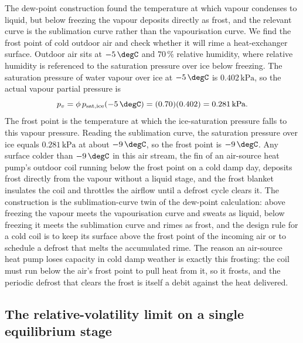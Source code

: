 The dew-point construction found the temperature at which vapour condenses to
liquid, but below freezing the vapour deposits directly as frost, and the
relevant curve is the sublimation curve rather than the vapourisation curve. We
find the frost point of cold outdoor air and check whether it will rime a
heat-exchanger surface. Outdoor air sits at $-5\,\degC$ and $70\,\%$ relative
humidity, where relative humidity is referenced to the saturation pressure over
ice below freezing. The saturation pressure of water vapour over ice at
$-5\,\degC$ is $0.402\,\text{kPa}$, so the actual vapour partial pressure is
\[
p_v = \phi\,p_{\text{sat,ice}}(-5\,\degC) = (0.70)(0.402) = 0.281\,\text{kPa}.
\]
The frost point is the temperature at which the ice-saturation pressure falls to
this vapour pressure. Reading the sublimation curve, the saturation pressure
over ice equals $0.281\,\text{kPa}$ at about $-9\,\degC$, so the frost point is
$-9\,\degC$. Any surface colder than $-9\,\degC$ in this air stream, the fin of
an air-source heat pump's outdoor coil running below the frost point on a cold
damp day, deposits frost directly from the vapour without a liquid stage, and
the frost blanket insulates the coil and throttles the airflow until a defrost
cycle clears it. The construction is the sublimation-curve twin of the
dew-point calculation: above freezing the vapour meets the vapourisation curve
and sweats as liquid, below freezing it meets the sublimation curve and rimes as
frost, and the design rule for a cold coil is to keep its surface above the
frost point of the incoming air or to schedule a defrost that melts the
accumulated rime. The reason an air-source heat pump loses capacity in cold damp
weather is exactly this frosting: the coil must run below the air's frost point
to pull heat from it, so it frosts, and the periodic defrost that clears the
frost is itself a debit against the heat delivered.

\subsection{The relative-volatility limit on a single equilibrium stage}

